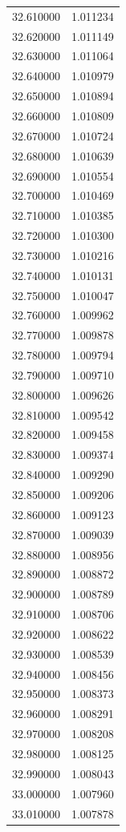 \begin{tabular}{rr}
32.610000 & 1.011234 \\
32.620000 & 1.011149 \\
32.630000 & 1.011064 \\
32.640000 & 1.010979 \\
32.650000 & 1.010894 \\
32.660000 & 1.010809 \\
32.670000 & 1.010724 \\
32.680000 & 1.010639 \\
32.690000 & 1.010554 \\
32.700000 & 1.010469 \\
32.710000 & 1.010385 \\
32.720000 & 1.010300 \\
32.730000 & 1.010216 \\
32.740000 & 1.010131 \\
32.750000 & 1.010047 \\
32.760000 & 1.009962 \\
32.770000 & 1.009878 \\
32.780000 & 1.009794 \\
32.790000 & 1.009710 \\
32.800000 & 1.009626 \\
32.810000 & 1.009542 \\
32.820000 & 1.009458 \\
32.830000 & 1.009374 \\
32.840000 & 1.009290 \\
32.850000 & 1.009206 \\
32.860000 & 1.009123 \\
32.870000 & 1.009039 \\
32.880000 & 1.008956 \\
32.890000 & 1.008872 \\
32.900000 & 1.008789 \\
32.910000 & 1.008706 \\
32.920000 & 1.008622 \\
32.930000 & 1.008539 \\
32.940000 & 1.008456 \\
32.950000 & 1.008373 \\
32.960000 & 1.008291 \\
32.970000 & 1.008208 \\
32.980000 & 1.008125 \\
32.990000 & 1.008043 \\
33.000000 & 1.007960 \\
33.010000 & 1.007878 \\

\end{tabular}
